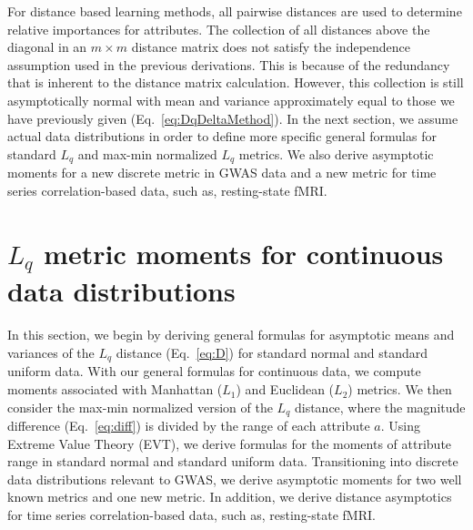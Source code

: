 \documentclass[aos]{imsart}
\begin{document}
For distance based learning methods, all pairwise distances are used to determine relative importances for attributes. The collection of all distances above the diagonal in an $m \times m$ distance matrix does not satisfy the independence assumption used in the previous derivations. This is because of the redundancy that is inherent to the distance matrix calculation. However, this collection is still asymptotically normal with mean and variance approximately equal to those we have previously given (Eq.~\ref{eq:DqDeltaMethod}). In the next section, we assume actual data distributions in order to define more specific general formulas for standard $L_q$ and max-min normalized $L_q$ metrics. We also derive asymptotic moments for a new discrete metric in GWAS data and a new metric for time series correlation-based data, such as, resting-state fMRI.


\section{\texorpdfstring{$L_q$}{} metric moments for continuous data distributions}\label{sec:moment_derivations}

In this section, we begin by deriving general formulas for asymptotic means and variances of the $L_q$ distance (Eq.~\ref{eq:D}) for standard normal and standard uniform data. With our general formulas for continuous data, we compute moments associated with Manhattan ($L_1$) and Euclidean ($L_2$) metrics. We then consider the max-min normalized version of the $L_q$ distance, where the magnitude difference (Eq.~\ref{eq:diff}) is divided by the range of each attribute $a$. Using Extreme Value Theory (EVT), we derive formulas for the moments of attribute range in standard normal and standard uniform data. Transitioning into discrete data distributions relevant to GWAS, we derive asymptotic moments for two well known metrics and one new metric. In addition, we derive distance asymptotics for time series correlation-based data, such as, resting-state fMRI. 
\end{document}
